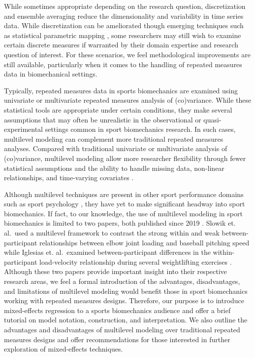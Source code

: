 \documentclass[
]{article}
\begin{document}
While sometimes appropriate depending on the research question, discretization and ensemble averaging reduce the dimensionality and variability in time series data. While discretization can be ameliorated though emerging techniques such as statistical parametric mapping \cite{pataky2019}, some researchers may still wish to examine certain discrete measures if warranted by their domain expertise and research question of interest. For these scenarios, we feel methodological improvements are still available, particularly when it comes to the handling of repeated measures data in biomechanical settings.

Typically, repeated measures data in sports biomechanics are examined using univariate or multivariate repeated measures analysis of (co)variance. While these statistical tools are appropriate under certain conditions, they make several assumptions that may often be unrealistic in the observational or quasi-experimental settings common in sport biomechanics research. In such cases, multilevel modeling can complement more traditional repeated measures analyses. Compared with traditional univariate or multivariate analysis of (co)variance, multilevel modeling allow more researcher flexibility through fewer statistical assumptions and the ability to handle missing data, non-linear relationships, and time-varying covariates \cite{hox2017}.

Although multilevel techniques are present in other sport performance domains such as sport psychology \cite{beauchamp2005,benson2016,cornelius2007}, they have yet to make significant headway into sport biomechanics. If fact, to our knowledge, the use of multilevel modeling in sport biomechanics is limited to two papers, both published since 2019 \cite{slowik2019, iglesias2021}. Slowik et. al.~used a multilevel framework to contrast the strong within and weak between-participant relationships between elbow joint loading and baseball pitching speed \cite{slowik2019} while Iglesias et. al.~examined between-participant differences in the within-participant load-velocity relationship during several weightlifting exercises \cite{iglesias2021}. Although these two papers provide important insight into their respective research areas, we feel a formal introduction of the advantages, disadvantages, and limitations of multilevel modeling would benefit those in sport biomechanics working with repeated measures designs. Therefore, our purpose is to introduce mixed-effects regression to a sports biomechanics audience and offer a brief tutorial on model notation, construction, and interpretation. We also outline the advantages and disadvantages of multilevel modeling over traditional repeated measures designs and offer recommendations for those interested in further exploration of mixed-effects techniques.
\end{document}
